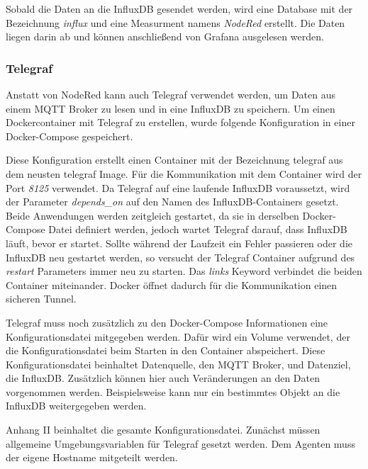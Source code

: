 \documentclass[a4paper, 12pt, oneside, toc=listofnumbered, bibliography=totoc]{scrbook}
\begin{document}
			Sobald die Daten an die InfluxDB gesendet werden, wird eine Database mit der Bezeichnung \textit{influx} und eine Measurment namens \textit{NodeRed} erstellt. Die Daten liegen darin ab und können anschließend von Grafana ausgelesen werden.
			
			\subsubsection{Telegraf}
			
			Anstatt von NodeRed kann auch Telegraf verwendet werden, um Daten aus einem MQTT Broker zu lesen und in eine InfluxDB zu speichern. Um einen Dockercontainer mit Telegraf zu erstellen, wurde folgende Konfiguration in einer Docker-Compose gespeichert.
			
			
			
			Diese Konfiguration erstellt einen Container mit der Bezeichnung telegraf aus dem neusten telegraf Image. Für die Kommunikation mit dem Container wird der Port \textit{8125} verwendet. Da Telegraf auf eine laufende InfluxDB voraussetzt, wird der Parameter \textit{depends\_on} auf den Namen des InfluxDB-Containers gesetzt. Beide Anwendungen werden zeitgleich gestartet, da sie in derselben Docker-Compose Datei definiert werden, jedoch wartet Telegraf darauf, dass InfluxDB läuft, bevor er startet. Sollte während der Laufzeit ein Fehler passieren oder die InfluxDB neu gestartet werden, so versucht der Telegraf Container aufgrund des \textit{restart} Parameters immer neu zu starten. Das \textit{links} Keyword verbindet die beiden Container miteinander. Docker öffnet dadurch für die Kommunikation einen sicheren Tunnel.
			
			Telegraf muss noch zusätzlich zu den Docker-Compose Informationen eine Konfigurationsdatei mitgegeben werden. Dafür wird ein Volume verwendet, der die Konfigurationsdatei beim Starten in den Container abspeichert. Diese Konfigurationsdatei beinhaltet Datenquelle, den MQTT Broker, und Datenziel, die InfluxDB. Zusätzlich können hier auch Veränderungen an den Daten vorgenommen werden. Beispielsweise kann nur ein bestimmtes Objekt an die InfluxDB weitergegeben werden. 
			
			Anhang II beinhaltet die gesamte Konfigurationsdatei. Zunächst müssen allgemeine Umgebungsvariablen für Telegraf gesetzt werden. Dem Agenten muss der eigene Hostname mitgeteilt werden. 
			
			
			
\end{document}
